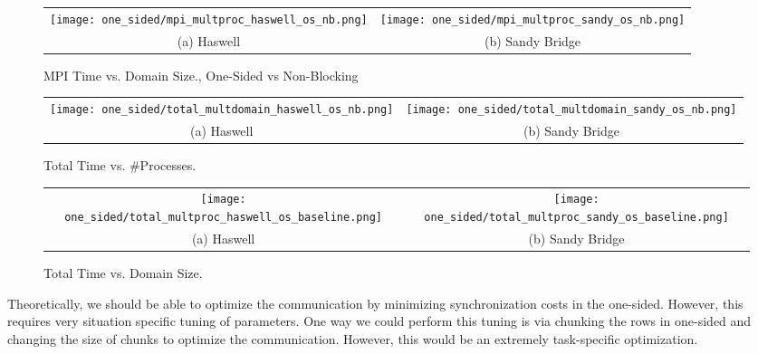 \begin{enumerate}
		\begin{figure}[h] %
		\hspace*{-0.25\linewidth}\begin{tabular}{cc}
			\texttt{[image: one\_sided/mpi\_multproc\_haswell\_os\_nb.png]} & \texttt{[image: one\_sided/mpi\_multproc\_sandy\_os\_nb.png]} \\
			(a) Haswell &  (b) Sandy Bridge\\[6pt]
		\end{tabular}
		\caption{MPI Time vs. Domain Size., One-Sided vs Non-Blocking}
		\label{fig:mpi_multproc_os_nb}
	\end{figure}
	
			\begin{figure}[h] %
		\hspace*{-0.25\linewidth}\begin{tabular}{cc}
			\texttt{[image: one\_sided/total\_multdomain\_haswell\_os\_nb.png]} & \texttt{[image: one\_sided/total\_multdomain\_sandy\_os\_nb.png]} \\
			(a) Haswell &  (b) Sandy Bridge\\[6pt]
		\end{tabular}
		\caption{Total Time vs. \#Processes.}
		\label{fig:total_multdomain_os_nb}
	\end{figure}
	
		\begin{figure}[h] %
		\hspace*{-0.25\linewidth}\begin{tabular}{cc}
			\texttt{[image: one\_sided/total\_multproc\_haswell\_os\_baseline.png]} & \texttt{[image: one\_sided/total\_multproc\_sandy\_os\_baseline.png]} \\
			(a) Haswell &  (b) Sandy Bridge\\[6pt]
		\end{tabular}
		\caption{Total Time vs. Domain Size.}
		\label{fig:total_multproc_os_nb}
	\end{figure}
Theoretically, we should be able to optimize the communication by minimizing synchronization costs in the one-sided. However, this requires very situation specific tuning of parameters. One way we could perform this tuning is via chunking the rows in one-sided and changing the size of chunks to optimize the communication. However, this would be an extremely task-specific optimization.

\end{enumerate}

